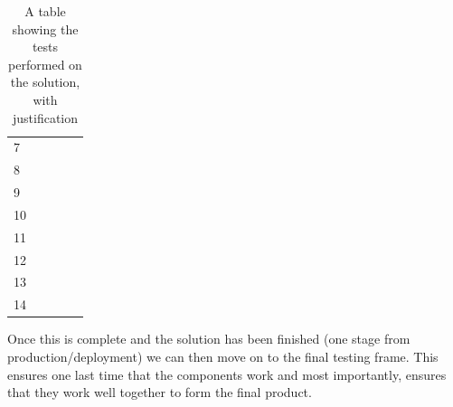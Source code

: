 \documentclass[9pt]{article}
\begin{document}
\begin{table}[H]
\begin{tabularx}{\textwidth}{lXlXX}
		7                                                                                   &                               &                    &                                &                                \\
		8                                                                                   &                               &                    &                                &                                \\
		9                                                                                   &                               &                    &                                &                                \\
		10                                                                                  &                               &                    &                                &                                \\
		11                                                                                  &                               &                    &                                &                                \\
		12                                                                                  &                               &                    &                                &                                \\
		13                                                                                  &                               &                    &                                &                                \\
		14                                                                                  &                               &                    &                                &                                \\ \bottomrule
	\end{tabularx}
	\caption{A table showing the tests performed on the solution, with justification}
	\label{tab_testingDesignSolution}
\end{table}
Once this is complete and the solution has been finished (one stage from production/deployment) we can then move on to the final testing frame. This ensures one last time that the components work and most importantly, ensures that they work well together to form the final product.
\end{document}
